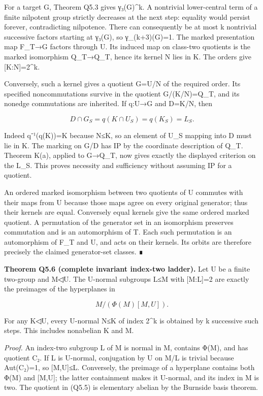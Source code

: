 \documentclass[
  10pt,
  letterpaper,
]{article}
\newcounter{none} %
\begin{document}
For a target G, Theorem Q5.3 gives \textbar γ₃(G)\^{}k. A
nontrivial lower-central term of a finite nilpotent group strictly
decreases at the next step: equality would persist forever,
contradicting nilpotence. There can consequently be at most k nontrivial
successive factors starting at γ₃(G), so γ\_(k+3)(G)=1. The marked
presentation map F\_T→G factors through U. Its induced map on class-two
quotients is the marked isomorphism Q\_T→Q\_T, hence its kernel N lies
in K. The orders give {[}K:N{]}=2\^{}k.

Conversely, such a kernel gives a quotient G=U/N of the required order.
Its specified noncommutations survive in the quotient G/(K/N)=Q\_T, and
its nonedge commutations are inherited. If q:U→G and D=K/N, then

\[
D\cap G_S=q(K\cap U_S)=q(K_S)=L_S.
\tag{Q5.4}
\]

Indeed q⁻¹(q(K))=K because N≤K, so an element of U\_S mapping into D
must lie in K. The marking on G/D has IP by the coordinate description
of Q\_T. Theorem K(a), applied to G→Q\_T, now gives exactly the
displayed criterion on the L\_S. This proves necessity and sufficiency
without assuming IP for a quotient.

An ordered marked isomorphism between two quotients of U commutes with
their maps from U because those maps agree on every original generator;
thus their kernels are equal. Conversely equal kernels give the same
ordered marked quotient. A permutation of the generator set in an
isomorphism preserves commutation and is an automorphism of T. Each such
permutation is an automorphism of F\_T and U, and acts on their kernels.
Its orbits are therefore precisely the claimed generator-set classes. ∎

\textbf{Theorem Q5.6 (complete invariant index-two ladder).} Let U be a
finite two-group and M◁U. The U-normal subgroups L≤M with {[}M:L{]}=2
are exactly the preimages of the hyperplanes in

\[
M/(\Phi(M)[M,U]).
\tag{Q5.5}
\]

For any K◁U, every U-normal N≤K of index 2\^{}k is obtained by k
successive such steps. This includes nonabelian K and M.

\emph{Proof.} An index-two subgroup L of M is normal in M, contains
Φ(M), and has quotient C₂. If L is U-normal, conjugation by U on M/L is
trivial because Aut(C₂)=1, so {[}M,U{]}≤L. Conversely, the preimage of a
hyperplane contains both Φ(M) and {[}M,U{]}; the latter containment
makes it U-normal, and its index in M is two. The quotient in (Q5.5) is
elementary abelian by the Burnside basis theorem.
\end{document}
